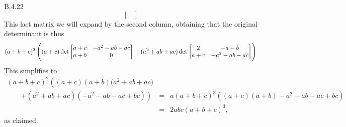 \begin{Answer}{B.4.22}
$$\begin{bmatrix}
\end{bmatrix}$$
This last matrix we will expand by the second column, obtaining that
the original determinant is thus
$$ (a+b+c)^2\left((a+c)\det\begin{bmatrix}a+c & -a^2-ab-ac \cr  a+b & 0  \end{bmatrix} +(a^2+ab+ac)\det\begin{bmatrix} 2 & -a-b \cr a+c & -a^2-ab-ac \end{bmatrix}\right)  $$
This simplifies to
$$\begin{array}{lll}
(a+b+c)^2\left((a+c)(a+b)(a^2+ab+ac\right.)\\
\qquad \left.+(a^2+ab+ac)(-a^2-ab-ac+bc)\right) & = &
a(a+b+c)^3((a+c)(a+b)-a^2-ab-ac+bc)\\ & = &
2abc(a+b+c)^3,\end{array}
$$ as claimed.




\end{Answer}
